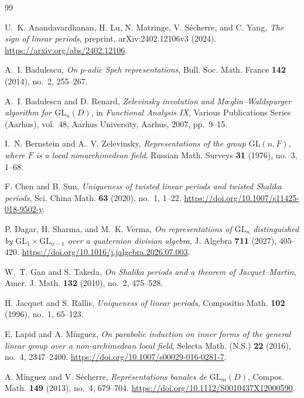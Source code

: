 \documentclass[11pt,leqno]{amsart}
\numberwithin{equation}{section}
\theoremstyle{plain}
\theoremstyle{definition}
\theoremstyle{remark}
\begin{document}
	\begin{thebibliography}{99}
		
		
		U.~K. Anandavardhanan, H. Lu, N. Matringe,
		V. S\'echerre, and C. Yang,
		\emph{The sign of linear periods},
		preprint, arXiv:2402.12106v3 (2024).
		\url{https://arxiv.org/abs/2402.12106}.
		
		A.~I. Badulescu,
		\emph{On $p$-adic Speh representations},
		Bull. Soc. Math. France \textbf{142} (2014),
		no.~2, 255--267.
		
		A.~I. Badulescu and D. Renard,
		\emph{Zelevinsky involution and M\oe glin--Waldspurger
			algorithm for $\mathrm{GL}_n(D)$},
		in \emph{Functional Analysis IX},
		Various Publications Series (Aarhus), vol.~48,
		Aarhus University, Aarhus, 2007, pp.~9--15.
		
		I.~N. Bernstein and A.~V. Zelevinsky,
		\emph{Representations of the group $\mathrm{GL}(n,F)$,
			where $F$ is a local nonarchimedean field},
		Russian Math. Surveys \textbf{31} (1976),
		no.~3, 1--68.
		
		F. Chen and B. Sun,
		\emph{Uniqueness of twisted linear periods and twisted
			Shalika periods},
		Sci. China Math. \textbf{63} (2020),
		no.~1, 1--22.
		\url{https://doi.org/10.1007/s11425-018-9502-y}.
		
		P. Dagar, H. Sharma, and M.~K. Verma,
		\emph{On representations of $\mathrm{GL}_n$ distinguished
			by $\mathrm{GL}_1\times\mathrm{GL}_{n-1}$ over a quaternion
			division algebra},
		J. Algebra \textbf{711} (2027), 405--420.
		\url{https://doi.org/10.1016/j.jalgebra.2026.07.003}.
		
		W.~T. Gan and S. Takeda,
		\emph{On Shalika periods and a theorem of Jacquet--Martin},
		Amer. J. Math. \textbf{132} (2010),
		no.~2, 475--528.
		
		H. Jacquet and S. Rallis,
		\emph{Uniqueness of linear periods},
		Compositio Math. \textbf{102} (1996),
		no.~1, 65--123.
		
		E. Lapid and A. M\'inguez,
		\emph{On parabolic induction on inner forms of the general
			linear group over a non-archimedean local field},
		Selecta Math. (N.S.) \textbf{22} (2016),
		no.~4, 2347--2400.
		\url{https://doi.org/10.1007/s00029-016-0281-7}.
		
		A. M\'inguez and V. S\'echerre,
		\emph{Repr\'esentations banales de $\mathrm{GL}_m(D)$},
		Compos. Math. \textbf{149} (2013),
		no.~4, 679--704.
		\url{https://doi.org/10.1112/S0010437X12000590}.
		

\end{thebibliography}
\end{document}
